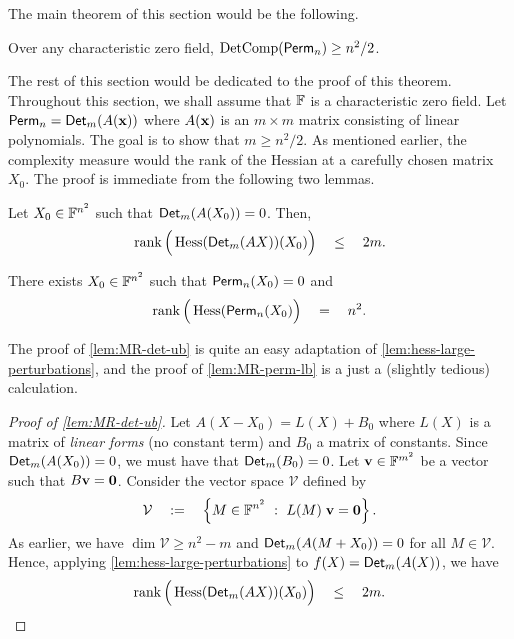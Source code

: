 The main theorem of this section would be the following. 

\begin{theorem}[\cite{mr04}]\label{thm:Mignon-Ressayre-mainthm}
Over any characteristic zero field, $\operatorname{DetComp}(\operatorname{\mathsf{Perm}}_n) \geq n^2/2$.
\end{theorem}

The rest of this section would be dedicated to the proof of this theorem.
Throughout this section, we shall assume that $\mathbb{F}$ is a characteristic zero field.
Let $\operatorname{\mathsf{Perm}}_n = \operatorname{\mathsf{Det}}_m(A(\mathbf{x}))$ where $A(\mathbf{x})$ is an $m\times m$ matrix consisting of linear polynomials.
The goal is to show that $m \geq n^2/2$.
As mentioned earlier, the complexity measure would the rank of the Hessian at a carefully chosen matrix $X_0$.
The proof is immediate from the following two lemmas.

\begin{lemma}\label{lem:MR-det-ub} Let $X_0 \in \mathbb{F}^{n^2}$ such that $\operatorname{\mathsf{Det}}_m(A(X_0)) = 0$. Then, 
\[
\operatorname{rank}\Big(\operatorname{Hess}(\operatorname{\mathsf{Det}}_m(AX))(X_0)\Big) \quad \leq \quad 2m.
\]
\end{lemma}

\begin{lemma}\label{lem:MR-perm-lb} There exists  $X_0 \in \mathbb{F}^{n^2}$ such that $\operatorname{\mathsf{Perm}}_n(X_0) = 0$ and
\[
\operatorname{rank}\Big(\operatorname{Hess}(\operatorname{\mathsf{Perm}}_n(X_0)\Big) \quad = \quad n^2.
\]
\end{lemma}

The proof of \autoref{lem:MR-det-ub} is quite an easy adaptation of \autoref{lem:hess-large-perturbations}, and the proof of \autoref{lem:MR-perm-lb} is a just a (slightly tedious) calculation. 

\begin{proof}[Proof of \autoref{lem:MR-det-ub}]
Let $A(X - X_0) = L(X) + B_0$ where $L(X)$ is a matrix of \emph{linear forms} (no constant term) and $B_0$ a matrix of constants. Since $\operatorname{\mathsf{Det}}_m(A(X_0)) = 0$, we must have that $\operatorname{\mathsf{Det}}_m(B_0) = 0$. Let $\mathbf{v} \in \mathbb{F}^{m^2}$ be a vector such that $B\mathbf{v} = \mathbf{0}$. Consider the vector space $\mathcal{V}$ defined by
\[
\mathcal{V} \quad := \quad \left\{{M\in \mathbb{F}^{n^2}}\ : \ {L(M)\; \mathbf{v} = \mathbf{0}}\right\}. 
\]
As earlier, we have  $\dim \mathcal{V} \geq n^2 - m$ and $\operatorname{\mathsf{Det}}_m(A(M + X_0)) = 0$ for all $M \in \mathcal{V}$. Hence, applying \autoref{lem:hess-large-perturbations} to $f(X) = \operatorname{\mathsf{Det}}_m(A(X))$, we have
\[
\operatorname{rank}\Big(\operatorname{Hess}(\operatorname{\mathsf{Det}}_m(AX))(X_0)\Big) \quad \leq \quad 2m.\qedhere
\]
\end{proof}

